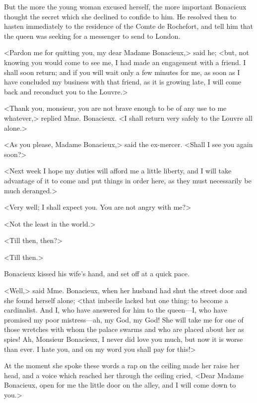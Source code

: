 But the more the young woman excused herself, the more important Bonacieux thought the secret which she declined to confide to him. He resolved then to hasten immediately to the residence of the Comte de Rochefort, and tell him that the queen was seeking for a messenger to send to London. 

<Pardon me for quitting you, my dear Madame Bonacieux,> said he; <but, not knowing you would come to see me, I had made an engagement with a friend. I shall soon return; and if you will wait only a few minutes for me, as soon as I have concluded my business with that friend, as it is growing late, I will come back and reconduct you to the Louvre.> 

<Thank you, monsieur, you are not brave enough to be of any use to me whatever,> replied Mme. Bonacieux. <I shall return very safely to the Louvre all alone.> 

<As you please, Madame Bonacieux,> said the ex-mercer. <Shall I see you again soon?> 

<Next week I hope my duties will afford me a little liberty, and I will take advantage of it to come and put things in order here, as they must necessarily be much deranged.> 

<Very well; I shall expect you. You are not angry with me?> 

<Not the least in the world.> 

<Till then, then?> 

<Till then.> 

Bonacieux kissed his wife's hand, and set off at a quick pace. 

<Well,> said Mme. Bonacieux, when her husband had shut the street door and she found herself alone; <that imbecile lacked but one thing: to become a cardinalist. And I, who have answered for him to the queen---I, who have promised my poor mistress---ah, my God, my God! She will take me for one of those wretches with whom the palace swarms and who are placed about her as spies! Ah, Monsieur Bonacieux, I never did love you much, but now it is worse than ever. I hate you, and on my word you shall pay for this!> 

At the moment she spoke these words a rap on the ceiling made her raise her head, and a voice which reached her through the ceiling cried, <Dear Madame Bonacieux, open for me the little door on the alley, and I will come down to you.>
